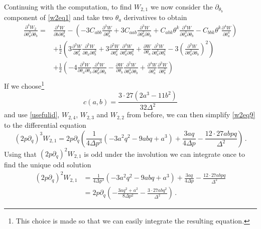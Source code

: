 \documentclass{article}
\theoremstyle{definition}
\numberwithin{equation}{section}
\begin{document}
Continuing with the computation, to find $W_{2,1}$ we now consider the $\partial_{\theta_b}$ component of \eqref{w2eq1} and take two $\theta_a$ derivatives to obtain
\begin{equation}\label{w2eq9}
    \begin{split}
        \frac{\partial^4W_{2}}{\partial \theta_a^3\partial \theta_b}=&\frac{\partial^4W}{\partial b \partial \theta_a^3}-\left(-3C_{abb}\frac{\partial^3W}{\partial \theta_a^3}+3C_{aab}\frac{\partial^3W}{\partial \theta_a^2 \partial \theta_b}+C_{abk}\theta^k\frac{\partial^4W}{\partial \theta_a^3 \partial \theta_b}-C_{bbk}\theta^k\frac{\partial^4W}{\partial \theta_a^4}\right)\\
        &+\frac{1}{2}\left(3\frac{\partial^3W}{\partial \theta_a^3}\frac{\partial^3W}{\partial \theta_a \partial \theta_b^2}+3\frac{\partial^2W}{\partial \theta_a^2}\frac{\partial^4W}{\partial \theta_a^2 \partial \theta_b^2}+\frac{\partial W}{\partial \theta_a}\frac{\partial^5W}{\partial \theta_a^3 \partial \theta_b^2}-3\left(\frac{\partial^3W}{\partial \theta_a^2 \partial \theta_b}\right)^2\right)\\
        &+\frac{1}{2}\left(-4\frac{\partial^2W}{\partial \theta_a \partial \theta_b}\frac{\partial^4W}{\partial \theta_a^3 \partial \theta_b}-\frac{\partial W}{\partial \theta_b}\frac{\partial^5W}{\partial \theta_a^4 \partial \theta_b}+\frac{\partial^4W}{\partial \theta_a^4}\frac{\partial^2W}{\partial \theta_b^2}\right)\\
    \end{split}
\end{equation}
If we choose\footnote{This choice is made so that we can easily integrate the resulting equation.}
\begin{equation}
c(a,b)=\frac{3\cdot 27(2a^3-11b^2)}{32\Delta^2}
\end{equation}
and use \eqref{usefulid}, $W_{2,4}$, $W_{2,3}$ and $W_{2,2}$ from before, we can then simplify \eqref{w2eq9} to the differential equation
\begin{equation}\label{w2eq10}
    (2p\partial_q)^3W_{2,1}=2p\partial_q\left(\frac{1}{4\Delta p^3}(-3a^2q^2-9abq+a^3)+\frac{3aq}{4\Delta p}-\frac{12\cdot 27 abpq}{\Delta^2}\right)\,.
\end{equation}
Using that $(2p\partial_q)^2W_{2,1}$ is odd under the involution we can integrate once to find the unique odd solution
\begin{equation*}
\begin{split} (2p\partial_q)^2W_{2,1}&=\frac{1}{4\Delta p^3}(-3a^2q^2-9abq+a^3)+\frac{3aq}{4\Delta p}-\frac{12\cdot 27 abpq}{\Delta^2}\\
&=2p\partial_q\left(-\frac{3aq^2+a^2}{8\Delta p^2}-\frac{3\cdot 27 abq^2}{\Delta^2}\right)\,.
\end{split}
\end{equation*}
\end{document}
